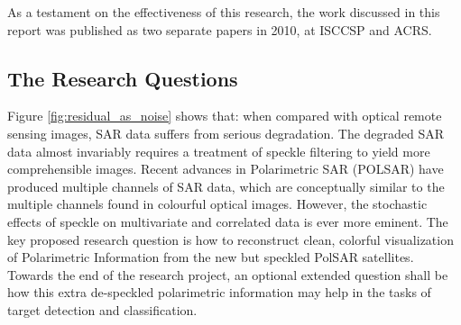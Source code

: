 As a testament on the effectiveness of this research, the work discussed in this report was published as two separate papers in 2010, at ISCCSP\cite{Le_2010_ISCCSP} and ACRS\cite{Le_2010_ACRS}.

\subsection{The Research Questions}

Figure 
	\ref{fig:residual_as_noise} 
shows that: when compared with optical remote sensing images, SAR data suffers from serious degradation.
The degraded SAR data almost invariably requires a treatment of speckle filtering to yield more comprehensible images.
Recent advances in Polarimetric SAR (POLSAR) have produced multiple channels of SAR data, which are conceptually similar to the multiple channels found in colourful optical images.
However, the stochastic effects of speckle on multivariate and correlated data is ever more eminent.
The key proposed research question is how to reconstruct clean, colorful visualization of Polarimetric Information from the new but speckled PolSAR satellites.
Towards the end of the research project, an optional extended question shall be how this extra de-speckled polarimetric information may help in the tasks of target detection and classification. 


